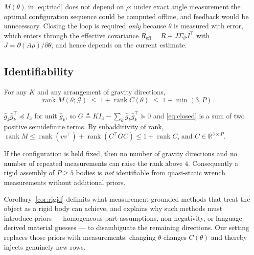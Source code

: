 \begin{remark}
\label{rem:closed-loop}
$M(\theta)$ in \eqref{eq:triad} does not depend on $\rho$: under exact angle
measurement the optimal configuration sequence could be computed offline, and
feedback would be unnecessary. Closing the loop is required \emph{only} because
$\theta$ is measured with error, which enters through the effective covariance
$R_{\mathrm{eff}}=R+J\Sigma_\theta J^{\!\top}$ with
$J=\partial(A\rho)/\partial\theta$, and hence depends on the current estimate.
\end{remark}

\subsection{Identifiability}
\label{sec:identifiability}

\begin{proposition}
\label{prop:rank}
For any $K$ and any arrangement of gravity directions,
%
\begin{equation}
\operatorname{rank}M(\theta;\mathcal{G})\;\le\;1+\operatorname{rank}C(\theta)
\;\le\;1+\min(3,P).
\end{equation}
\end{proposition}

\begin{IEEEproof}
$\hat g_k\hat g_k^{\!\top}\preceq I_3$ for unit $\hat g_k$, so
$G\triangleq K I_3-\sum_k\hat g_k\hat g_k^{\!\top}\succeq 0$ and
\eqref{eq:closed} is a sum of two positive semidefinite terms. By
subadditivity of rank,
$\operatorname{rank}M\le\operatorname{rank}(vv^{\!\top})
+\operatorname{rank}(C^{\!\top}GC)\le 1+\operatorname{rank}C$, and
$C\in\mathbb{R}^{3\times P}$.
\end{IEEEproof}

\begin{corollary}
\label{cor:rigid}
If the configuration is held fixed, then no number of gravity directions and no
number of repeated measurements can raise the rank above $4$. Consequently a
rigid assembly of $P\ge 5$ bodies is \emph{not} identifiable from quasi-static
wrench measurements without additional priors.
\end{corollary}

Corollary~\ref{cor:rigid} delimits what measurement-grounded methods that treat
the object as a rigid body can achieve, and explains why such methods must
introduce priors --- homogeneous-part assumptions, non-negativity, or
language-derived material guesses --- to disambiguate the remaining directions.
Our setting replaces those priors with measurements: changing $\theta$ changes
$C(\theta)$ and thereby injects genuinely new rows.

